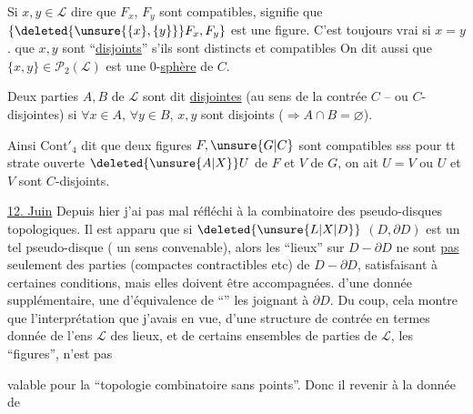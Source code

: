 
 Si $x,y\in \mathcal L$ dire que $F_x$, $F_y$ sont compatibles, signifie que $\{\deleted{\unsure{\{x\},\{y\}}}F_x,F_y\}$ est  une figure. C'est toujours vrai si $x=y$.   que \deleted{$\{$} $x,y$ sont ``\uline{disjoints}'' s'ils sont distincts et compatibles  On dit aussi  que $\{x,y\}\in \mathcal P_2(\mathcal L)$ est une 0-\uline{sphère} de $C$.

Deux parties  $A,B$ de $\mathcal L$ sont dit \uline{disjointes} (au sens de la contrée $C$ -- ou $C$-disjointes) si $\forall x\in A$, $\forall y\in B$, $x,y$ sont disjoints ($\Longrightarrow A\cap B=\varnothing$).


Ainsi $\mathrm{Cont}'_4$ dit que deux figures $F,\unsure{G|C}$ sont compatibles sss pour tt strate ouverte $\deleted{\unsure{A|X}}U$ de $F$ et $V$ de $G$,  on ait $U=V$ ou $U$ et $V$ sont $C$-disjoints.

\uline{12. Juin} Depuis hier j'ai pas mal réfléchi à la combinatoire des pseudo-disques topologiques. Il est apparu que si $\deleted{\unsure{L|X|D}}$ $(D,\partial D)$ est un tel pseudo-disque ( un sens convenable), alors les ``lieux'' sur $D-\partial D$ ne sont \uline{pas} seulement des parties (compactes contractibles etc) de $D-\partial D$, satisfaisant à certaines conditions, mais elles doivent être accompagnées. d'une donnée supplémentaire, une  d'équivalence de ``'' les joignant à $\partial D$. Du coup, cela montre que l'interprétation  que j'avais en vue, d'une structure de contrée en termes  donnée de l'ens $\mathcal L$ des lieux, et de certains ensembles de parties de $\mathcal L$, les ``figures'', n'est pas


\unsure{:} valable pour la ``topologie combinatoire sans points''. Donc il  revenir à la donnée de

